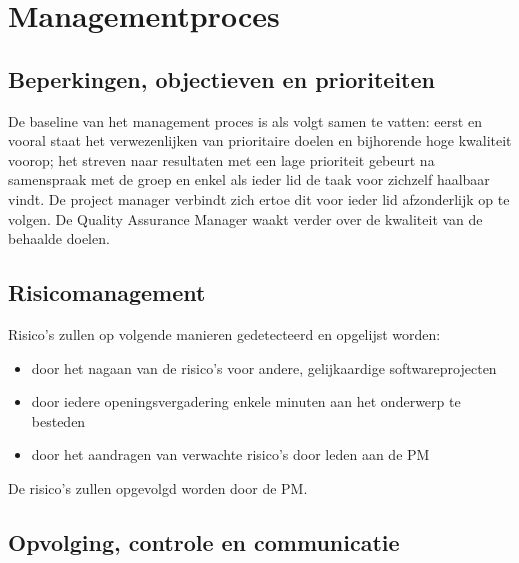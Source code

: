 \documentclass{article}
\begin{document}

\section{Managementproces}


\subsection{Beperkingen, objectieven en prioriteiten}

\noindent De baseline van het management proces is als volgt samen te vatten: eerst en vooral staat het verwezenlijken van prioritaire doelen en bijhorende hoge kwaliteit voorop; het streven naar resultaten met een lage prioriteit gebeurt na samenspraak met de groep en enkel als ieder lid de taak voor zichzelf haalbaar vindt. De project manager verbindt zich ertoe dit voor ieder lid afzonderlijk op te volgen. De Quality Assurance Manager waakt verder over de kwaliteit van de behaalde doelen. 



\subsection{Risicomanagement}
\label{subsec:risico}
Risico's zullen op volgende manieren gedetecteerd en opgelijst worden:

\begin{itemize}
\item door het nagaan van de risico's voor andere, gelijkaardige softwareprojecten
\item door iedere openingsvergadering enkele minuten aan het onderwerp te besteden 
\item door het aandragen van verwachte risico's door leden aan de PM 
\end{itemize}

De risico's zullen opgevolgd worden door de PM. \newline




\subsection{Opvolging, controle en communicatie}
\end{document}
